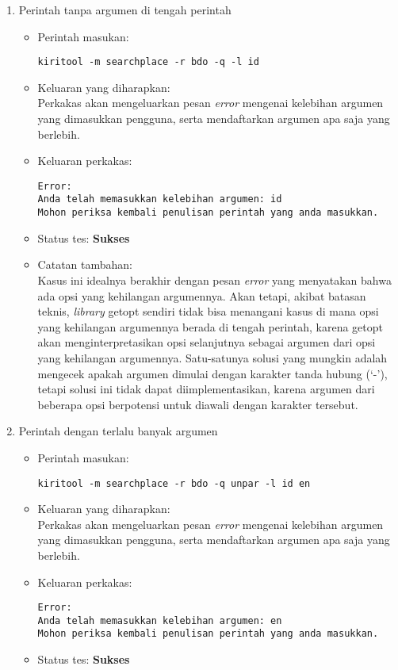\begin{enumerate}
	\item Perintah tanpa argumen di tengah perintah
	\begin{itemize}
		\item Perintah masukan:
		\begin{verbatim}
kiritool -m searchplace -r bdo -q -l id
		\end{verbatim}
		\item Keluaran yang diharapkan: \\
		Perkakas akan mengeluarkan pesan \textit{error} mengenai kelebihan argumen yang dimasukkan pengguna, serta mendaftarkan argumen apa saja yang berlebih.
		\item Keluaran perkakas:
		\begin{lstlisting}
Error:
Anda telah memasukkan kelebihan argumen: id
Mohon periksa kembali penulisan perintah yang anda masukkan.
		\end{lstlisting}
		\item Status tes: \textbf{Sukses}
		\item Catatan tambahan: \\
		Kasus ini idealnya berakhir dengan pesan \textit{error} yang menyatakan bahwa ada opsi yang kehilangan argumennya. Akan tetapi, akibat batasan teknis, \textit{library} getopt sendiri tidak bisa menangani kasus di mana opsi yang kehilangan argumennya berada di tengah perintah, karena getopt akan menginterpretasikan opsi selanjutnya sebagai argumen dari opsi yang kehilangan argumennya. Satu-satunya solusi yang mungkin adalah mengecek apakah argumen dimulai dengan karakter tanda hubung (`-'), tetapi solusi ini tidak dapat diimplementasikan, karena argumen dari beberapa opsi berpotensi untuk diawali dengan karakter tersebut.
	\end{itemize}
	
	\item Perintah dengan terlalu banyak argumen
	\begin{itemize}
		\item Perintah masukan:
		\begin{verbatim}
kiritool -m searchplace -r bdo -q unpar -l id en
		\end{verbatim}
		\item Keluaran yang diharapkan: \\
		Perkakas akan mengeluarkan pesan \textit{error} mengenai kelebihan argumen yang dimasukkan pengguna, serta mendaftarkan argumen apa saja yang berlebih.
		\item Keluaran perkakas:
		\begin{lstlisting}
Error:
Anda telah memasukkan kelebihan argumen: en
Mohon periksa kembali penulisan perintah yang anda masukkan.
		\end{lstlisting}
		\item Status tes: \textbf{Sukses}
	\end{itemize}
	

\end{enumerate}
